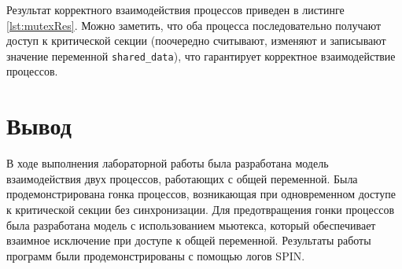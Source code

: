 \documentclass{bmstu}
\begin{document}
Результат корректного взаимодействия процессов приведен в листинге \ref{lst:mutexRes}. Можно заметить, что оба процесса последовательно получают доступ к критической секции (поочередно считывают, изменяют и записывают значение переменной \texttt{shared\_data}), что гарантирует корректное взаимодействие процессов.


\section{Вывод}

В ходе выполнения лабораторной работы была разработана модель взаимодействия двух процессов, работающих с общей переменной. Была продемонстрирована гонка процессов, возникающая при одновременном доступе к критической секции без синхронизации. Для предотвращения гонки процессов была разработана модель с использованием мьютекса, который обеспечивает взаимное исключение при доступе к общей переменной. Результаты работы программ были продемонстрированы с помощью логов SPIN.  
\end{document}

